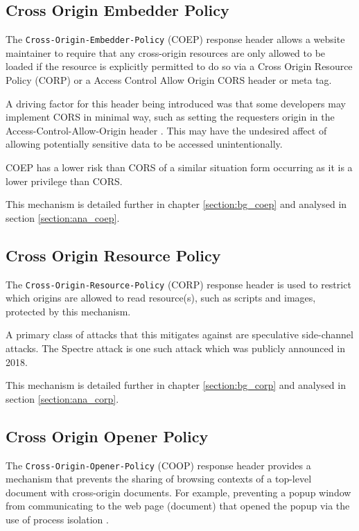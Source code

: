 \documentclass{mscreport}
\begin{document}
\subsection{Cross Origin Embedder Policy}
The \texttt{Cross-Origin-Embedder-Policy} (COEP) response header allows a website maintainer to require that any cross-origin resources are only allowed to be loaded if the resource is explicitly permitted to do so via a Cross Origin Resource Policy (CORP) or a Access Control Allow Origin CORS header or meta tag.

\vspace{0.3cm} \noindent
A driving factor for this header being introduced was that some developers may implement CORS in minimal way, such as setting the requesters origin in the Access-Control-Allow-Origin header \cite{noauthor_undated-cr}. This may have the undesired affect of allowing potentially sensitive data to be accessed unintentionally.

\vspace{0.3cm} \noindent
COEP has a lower risk than CORS of a similar situation form occurring as it is a lower privilege than CORS.

\vspace{0.3cm} \noindent
This mechanism is detailed further in chapter \ref{section:bg_coep} and analysed in section \ref{section:ana_coep}.


\subsection{Cross Origin Resource Policy}
The \texttt{Cross-Origin-Resource-Policy} (CORP) response header is used to restrict which origins are allowed to read resource(s), such as scripts and images, protected by this mechanism.

\vspace{0.3cm} \noindent
A primary class of attacks that this mitigates against are speculative side-channel attacks. The Spectre attack \cite{Kocher2019-gv} is one such attack which was publicly announced in 2018.

\vspace{0.3cm} \noindent
This mechanism is detailed further in chapter \ref{section:bg_corp} and analysed in section \ref{section:ana_corp}.


\subsection{Cross Origin Opener Policy}
The \texttt{Cross-Origin-Opener-Policy} (COOP) response header provides a mechanism that prevents the sharing of browsing contexts of a top-level document with cross-origin documents. For example, preventing a popup window from communicating to the web page (document) that opened the popup via the use of process isolation \cite{Apple_undated-gj}.
\end{document}
